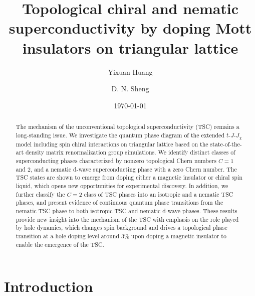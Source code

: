 \documentclass[aps,prx,reprint,superscriptaddress,showpacs]{revtex4-2}
\newcommand{\oim}[1]{{\color{blue} #1}}
\begin{document}
\title{Topological chiral and nematic superconductivity by doping Mott insulators  on triangular lattice}


\author{Yixuan Huang}

\author{D. N. Sheng}


\date{\today}

\begin{abstract}
\oim {The mechanism of the unconventional topological superconductivity (TSC) remains a long-standing issue. We investigate the quantum phase diagram  of the extended $t$-$J$-$J_{\chi}$ model including spin chiral interactions on triangular lattice based on the state-of-the-art density matrix renormalization group simulations. We identify  distinct classes of superconducting phases characterized by nonzero topological Chern numbers $C=1$ and $2$, and a nematic d-wave superconducting phase with a zero Chern number.} The TSC states are shown to emerge from doping either a magnetic insulator or chiral spin liquid,  which opens new opportunities  for experimental discovery. 
\oim {In addition, we further classify the $C=2$ class of TSC phases into  an isotropic and a nematic TSC phases,  and present evidence of continuous quantum phase transitions from the nematic TSC phase to both isotropic TSC and nematic d-wave phases.}
These results provide new insight into the  mechanism of the TSC with emphasis on the role played by hole dynamics, which changes spin background and drives a topological phase transition at a hole doping level around $3\%$ upon doping a magnetic insulator to enable the emergence of the TSC.
\end{abstract}

\pacs{}


\maketitle

\section{Introduction}
\label{introduction}
\end{document}
